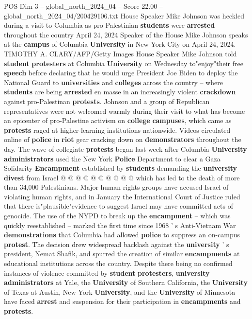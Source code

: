 \begin{textsample}{POS Dim 3 – global\_north\_2024\_04 – Score 22.00 – global\_north\_2024\_04/200429106.txt}  \label{ex:f3_pos_056}
House Speaker Mike Johnson was heckled during a visit to Columbia as pro-Palestinian \textbf{students} were \textbf{arrested} throughout the country April 24, 2024 Speaker of the House Mike Johnson speaks at the \textbf{campus} of Columbia \textbf{University} in New York City on April 24, 2024.
TIMOTHY A.
CLARY/AFP/Getty Images House Speaker Mike Johnson told \textbf{student} \textbf{protesters} at Columbia \textbf{University} on Wednesday to"enjoy"their free \textbf{speech} before declaring that he would urge President Joe Biden to deploy the National Guard to \textbf{universities} and \textbf{colleges} across the country -- where \textbf{students} are being \textbf{arrested} en masse in an increasingly violent \textbf{crackdown} against pro-Palestinan \textbf{protests}.
Johnson and a group of Republican representatives were not welcomed warmly during their visit to what has become an epicenter of pro-Palestine activism on \textbf{college} \textbf{campuses}, which came as \textbf{protests} raged at higher-learning institutions nationwide.
Videos circulated online of \textbf{police} in \textbf{riot} gear cracking down on \textbf{demonstrators} throughout the day.
The wave of collegiate \textbf{protests} began last week after Columbia \textbf{University} \textbf{administrators} used the New York \textbf{Police} Department to clear a Gaza Solidarity \textbf{Encampment} established by \textbf{students} demanding the \textbf{university} \textbf{divest} from Israel @ @ @ @ @ @ @ @ @ @ which has led to the death of more than 34,000 Palestinians.
Major human rights groups have accused Israel of violating human rights, and in January the International Court of Justice ruled that there is"plausible"evidence to suggest Israel may have committed acts of genocide.
The use of the NYPD to break up the \textbf{encampment} -- which was quickly reestablished -- marked the first time since 1968 ' s Anti-Vietnam War \textbf{demonstrations} that Columbia had allowed \textbf{police} to suppress an on-campus \textbf{protest}.
The decision drew widespread backlash against the \textbf{university} ' s president, Nemat Shafik, and spurred the creation of similar \textbf{encampments} at educational institutions across the country.
Despite there being no confirmed instances of violence committed by \textbf{student} \textbf{protesters}, \textbf{university} \textbf{administrators} at Yale, the \textbf{University} of Southern California, the \textbf{University} of Texas at Austin, New York \textbf{University}, and the \textbf{University} of Minnesota have faced \textbf{arrest} and suspension for their participation in \textbf{encampments} and \textbf{protests}.

\end{textsample}
